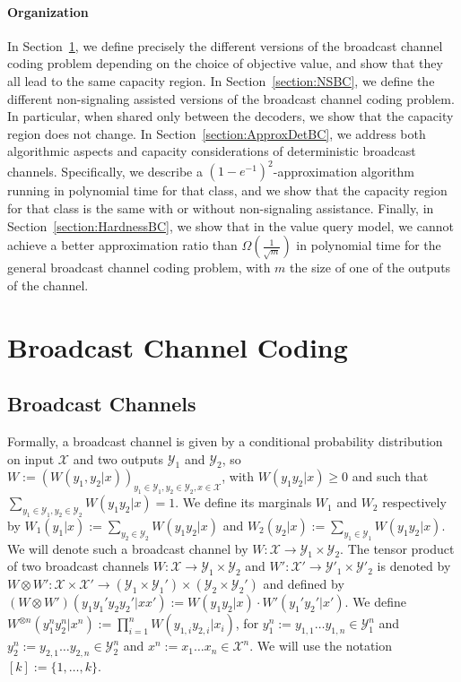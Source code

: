 \paragraph{Organization} In Section~\ref{section:BCCpb}, we define precisely the different versions of the broadcast channel coding problem depending on the choice of objective value, and show that they all lead to the same capacity region. In Section~\ref{section:NSBC}, we define the different non-signaling assisted versions of the broadcast channel coding problem. In particular, when shared only between the decoders, we show that the capacity region does not change. In Section~\ref{section:ApproxDetBC}, we address both algorithmic aspects and capacity considerations of deterministic broadcast channels. Specifically, we describe a $(1-e^{-1})^2$-approximation algorithm running in polynomial time for that class, and we show that the capacity region for that class is the same with or without non-signaling assistance. Finally, in Section~\ref{section:HardnessBC}, we show that in the value query model, we cannot achieve a better approximation ratio than $\Omega\left(\frac{1}{\sqrt{m}}\right)$ in polynomial time for the general broadcast channel coding problem, with $m$ the size of one of the outputs of the channel.

\section{Broadcast Channel Coding}
\label{section:BCCpb}
\subsection{Broadcast Channels}
Formally, a broadcast channel is given by a conditional probability distribution on input $\mathcal{X}$ and two outputs $\mathcal{Y}_1$ and $\mathcal{Y}_2$, so $W := \left(W(y_1,y_2|x)\right)_{y_1 \in \mathcal{Y}_1, y_2 \in \mathcal{Y}_2, x \in \mathcal{X}}$, with $W(y_1y_2|x) \geq 0$ and such that $\sum_{y_1 \in \mathcal{Y}_1, y_2 \in \mathcal{Y}_2} W(y_1y_2|x) = 1$. We define its marginals $W_1$ and $W_2$ respectively by $W_1(y_1|x) := \sum_{y_2 \in \mathcal{Y}_2} W(y_1y_2|x)$ and $W_2(y_2|x) := \sum_{y_1 \in \mathcal{Y}_1} W(y_1y_2|x)$. We will denote such a broadcast channel by $W : \mathcal{X} \rightarrow \mathcal{Y}_1 \times \mathcal{Y}_2$. The tensor product of two broadcast channels $W: \mathcal{X} \rightarrow \mathcal{Y}_1 \times \mathcal{Y}_2$ and $W': \mathcal{X}' \rightarrow \mathcal{Y}'_1 \times \mathcal{Y}'_2$ is denoted by $W \otimes W' : \mathcal{X} \times \mathcal{X}' \rightarrow (\mathcal{Y}_1 \times \mathcal{Y}_1') \times (\mathcal{Y}_2 \times \mathcal{Y}_2')$ and defined by $(W \otimes W')(y_1y_1'y_2y_2'|xx') := W(y_1y_2|x) \cdot W'(y_1'y_2'|x')$. We define $W^{\otimes n}(y_1^ny_2^n|x^n) := \prod_{i=1}^nW(y_{1,i}y_{2,i}|x_i)$, for $y_1^n := y_{1,1} \ldots y_{1,n} \in \mathcal{Y}_1^n$ and $y_2^n := y_{2,1} \ldots y_{2,n} \in \mathcal{Y}_2^n$ and $x^n := x_1 \ldots x_n \in \mathcal{X}^n$. We will use the notation $[k]:=\{1,\ldots,k\}$.

